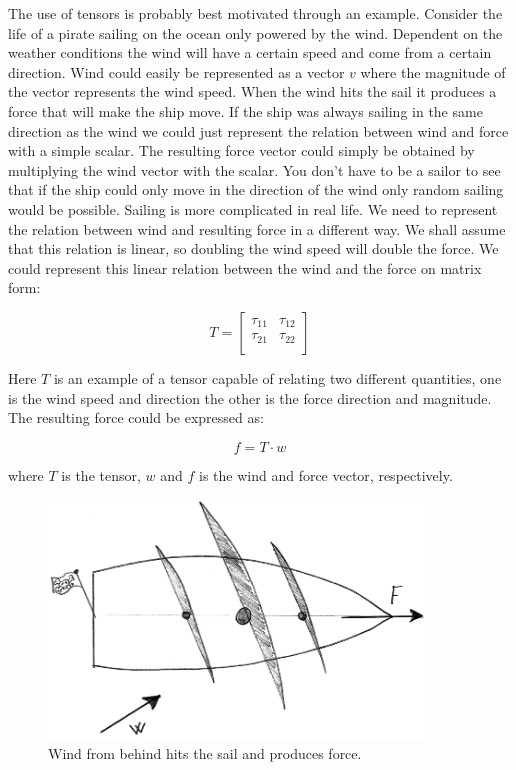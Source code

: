 
The use of tensors is probably best motivated through an
example. Consider the life of a pirate sailing on the ocean only
powered by the wind.
Dependent on the weather conditions the wind
will have a certain speed and come from a certain direction. Wind could easily
be represented as a vector $v$ where the magnitude of the vector
represents the wind speed. When the wind hits the sail it produces a
force that will make the ship move. If the ship was always sailing in the
same direction as the wind we could just represent the relation between
wind and force with a simple scalar. The resulting
force vector could simply be obtained by multiplying the wind vector with the
scalar. You don't have to be a sailor to see that if the ship
could only move in the direction of the wind only random sailing would
be possible. Sailing is more complicated in real life. We need to
represent the relation between wind and resulting force in a different
way. We shall assume that this relation is linear, so doubling the
wind speed will double the force. We could represent this linear relation
between the wind and the force on matrix form:

\begin{equation}
T = 
\begin{bmatrix} 
\tau_{11} & \tau_{12} \\
\tau_{21} & \tau_{22} \\
\end{bmatrix} 
\end{equation}

Here $T$ is an example of a tensor capable of relating two different quantities,
one is the wind speed and direction the other is the force direction
and magnitude. The resulting force could be expressed as:

\begin{equation}
f = T \cdot w
\end{equation}

where $T$ is the tensor, $w$ and $f$ is the wind and
force vector, respectively.

\begin{figure}
  \centering
  \includegraphics[width=10cm]{./images/mathematics_tensor_pirate_ship.png}
\caption{Wind from behind hits the sail and produces force.}
\label{fig:tensor_pirate_ship}
\end{figure}

